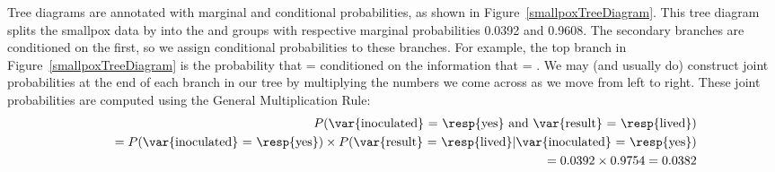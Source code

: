 Tree diagrams are annotated with marginal and conditional probabilities, as shown in Figure~\ref{smallpoxTreeDiagram}. This tree diagram splits the smallpox data by  into the  and  groups with respective marginal probabilities 0.0392 and 0.9608. The secondary branches are conditioned on the first, so we assign conditional probabilities to these branches. For example, the top branch in Figure~\ref{smallpoxTreeDiagram} is the probability that  =  conditioned on the information that  = . We may (and usually do) construct joint probabilities at the end of each branch in our tree by multiplying the numbers we come across as we move from left to right. These joint probabilities are computed using the General Multiplication Rule:
\begin{eqnarray*}
&& P(\text{\var{inoculated} = \resp{yes} and \var{result} = \resp{lived}}) \\
	&&\quad = P(\text{\var{inoculated} = \resp{yes}})\times P(\text{\var{result} = \resp{lived}}|\text{\var{inoculated} = \resp{yes}}) \\
	&&\quad = 0.0392\times 0.9754=0.0382
\end{eqnarray*}

